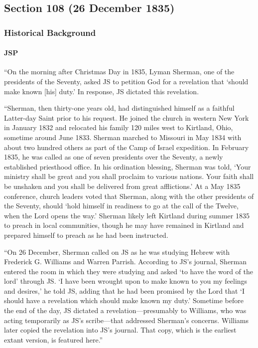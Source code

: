 \subsection{Section 108 (26 December 1835)}
	\label{DC108}
	
	\subsubsection{Historical Background}
		\label{DC108-HB}
		
		\paragraph{JSP}
		
			``On the morning after Christmas Day in 1835, Lyman Sherman, one of the presidents of the Seventy, asked JS to petition God for a revelation that `should make known [his] duty.' In response, JS dictated this revelation.
				
			``Sherman, then thirty-one years old, had distinguished himself as a faithful Latter-day Saint prior to his request. He joined the church in western New York in January 1832 and relocated his family 120 miles west to Kirtland, Ohio, sometime around June 1833. Sherman marched to Missouri in May 1834 with about two hundred others as part of the Camp of Israel expedition. In February 1835, he was called as one of seven presidents over the Seventy, a newly established priesthood office. In his ordination blessing, Sherman was told, `Your ministry shall be great and you shall proclaim to various nations. Your faith shall be unshaken and you shall be delivered from great afflictions.' At a May 1835 conference, church leaders voted that Sherman, along with the other presidents of the Seventy, should `hold himself in readiness to go at the call of the Twelve, when the Lord opens the way.' Sherman likely left Kirtland during summer 1835 to preach in local communities, though he may have remained in Kirtland and prepared himself to preach as he had been instructed.
			
			``On 26 December, Sherman called on JS as he was studying Hebrew with Frederick G. Williams and Warren Parrish. According to JS's journal, Sherman entered the room in which they were studying and asked `to have the word of the lord' through JS. `I have been wrought upon to make known to you my feelings and desires,' he told JS, adding that he had been promised by the Lord that `I should have a revelation which should make known my duty.' Sometime before the end of the day, JS dictated a revelation---presumably to Williams, who was acting temporarily as JS's scribe---that addressed Sherman's concerns. Williams later copied the revelation into JS's journal. That copy, which is the earliest extant version, is featured here.''
						
